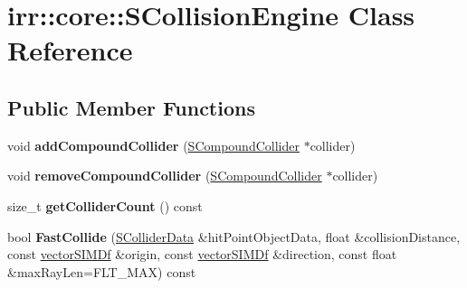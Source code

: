 \hypertarget{classirr_1_1core_1_1SCollisionEngine}{}\section{irr\+:\+:core\+:\+:S\+Collision\+Engine Class Reference}
\label{classirr_1_1core_1_1SCollisionEngine}
\subsection*{Public Member Functions}
\begin{DoxyCompactItemize}
\item 
void {\bfseries add\+Compound\+Collider} (\hyperlink{classirr_1_1core_1_1SCompoundCollider}{S\+Compound\+Collider} $\ast$collider)\hypertarget{classirr_1_1core_1_1SCollisionEngine_ac45899b7bfff2bfc886a6792c53478db}{}\label{classirr_1_1core_1_1SCollisionEngine_ac45899b7bfff2bfc886a6792c53478db}

\item 
void {\bfseries remove\+Compound\+Collider} (\hyperlink{classirr_1_1core_1_1SCompoundCollider}{S\+Compound\+Collider} $\ast$collider)\hypertarget{classirr_1_1core_1_1SCollisionEngine_a90b242aa237344d295ae0e2cf5a80ebd}{}\label{classirr_1_1core_1_1SCollisionEngine_a90b242aa237344d295ae0e2cf5a80ebd}

\item 
size\+\_\+t {\bfseries get\+Collider\+Count} () const \hypertarget{classirr_1_1core_1_1SCollisionEngine_af4189269db3df7a19c7f88878db9a19f}{}\label{classirr_1_1core_1_1SCollisionEngine_af4189269db3df7a19c7f88878db9a19f}

\item 
bool {\bfseries Fast\+Collide} (\hyperlink{classirr_1_1core_1_1SColliderData}{S\+Collider\+Data} \&hit\+Point\+Object\+Data, float \&collision\+Distance, const \hyperlink{classirr_1_1core_1_1vectorSIMDf}{vector\+S\+I\+M\+Df} \&origin, const \hyperlink{classirr_1_1core_1_1vectorSIMDf}{vector\+S\+I\+M\+Df} \&direction, const float \&max\+Ray\+Len=F\+L\+T\+\_\+\+M\+AX) const \hypertarget{classirr_1_1core_1_1SCollisionEngine_a56d3ee4c5d7ea01b50880aacea097c41}{}\label{classirr_1_1core_1_1SCollisionEngine_a56d3ee4c5d7ea01b50880aacea097c41}

\end{DoxyCompactItemize}
